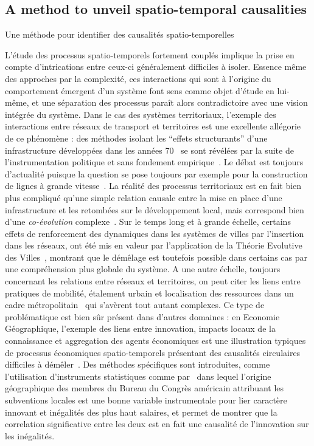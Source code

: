 {

}




\subsection[Spatio-temporal Causalities][Causalités Spatio-temporelles]{A method to unveil spatio-temporal causalities}{Une méthode pour identifier des causalités spatio-temporelles}


\bpar{
}
{
L'étude des processus spatio-temporels fortement couplés implique la prise en compte d'intrications entre ceux-ci généralement difficiles à isoler. Essence même des approches par la complexité, ces interactions qui sont à l'origine du comportement émergent d'un système font sens comme objet d'étude en lui-même, et une séparation des processus paraît alors contradictoire avec une vision intégrée du système. Dans le cas des systèmes territoriaux, l'exemple des interactions entre réseaux de transport et territoires est une excellente allégorie de ce phénomène : des méthodes isolant les ``effets structurants'' d'une infrastructure développées dans les années 70~\cite{bonnafous1974methodologies} se sont révélées par la suite de l'instrumentation politique et sans fondement empirique~\cite{offner1993effets}. Le débat est toujours d'actualité puisque la question se pose toujours par exemple pour la construction de lignes à grande vitesse~\cite{crozethalshs01094554}. La réalité des processus territoriaux est en fait bien plus compliqué qu'une simple relation causale entre la mise en place d'une infrastructure et les retombées sur le développement local, mais correspond bien d'une \emph{co-évolution} complexe~\cite{bretagnolletel00459720}. Sur le temps long et à grande échelle, certains effets de renforcement des dynamiques dans les systèmes de villes par l'insertion dans les réseaux, ont été mis en valeur par l'application de la Théorie Evolutive des Villes~\cite{espacegeo2014effets}, montrant que le démêlage est toutefois possible dans certains cas par une compréhension plus globale du système. A une autre échelle, toujours concernant les relations entre réseaux et territoires, on peut citer les liens entre pratiques de mobilité, étalement urbain et localisation des ressources dans un cadre métropolitain~\cite{cerqueira2017inegalites} qui s'avèrent tout autant complexes. Ce type de problématique est bien sûr présent dans d'autres domaines : en Economie Géographique, l'exemple des liens entre innovation, impacts locaux de la connaissance et aggregation des agents économiques est une illustration typiques de processus économiques spatio-temporels présentant des causalités circulaires difficiles à démêler~\cite{audretsch1996r}. Des méthodes spécifiques sont introduites, comme l'utilisation d'instruments statistiques comme par~\cite{aghion2015innovation} dans lequel l'origine géographique des membres du Bureau du Congrès américain attribuant les subventions locales est une bonne variable instrumentale pour lier caractère innovant et inégalités des plus haut salaires, et permet de montrer que la correlation significative entre les deux est en fait une causalité de l'innovation sur les inégalités.
}



